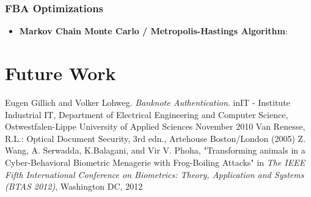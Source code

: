 \documentclass{article}
\begin{document}
\subsubsection{FBA Optimizations}

\begin{itemize}
\item \textbf{Markov Chain Monte Carlo / Metropolis-Hastings Algorithm}:
\end{itemize}

\section{Future Work}

\begin{thebibliography}{9}
Eugen Gillich and Volker Lohweg. \textit{Banknote Authentication}. inIT - Institute Industrial IT, Department of Electrical Engineering and Computer Science, Ostwestfalen-Lippe University of Applied Sciences
November 2010
Van Renesse, R.L.: Optical Document Security, 3rd edn., Artehouse Boston/London
(2005)
 Z. Wang, A. Serwadda, K.Balagani, and Vir V. Phoha, "Transforming animals in a Cyber-Behavioral Biometric Menagerie with Frog-Boiling Attacks" in \textit{The IEEE Fifth International Conference on Biometrics: Theory, Application and Systems (BTAS 2012)}, Washington DC, 2012
\end{thebibliography}
\end{document}

